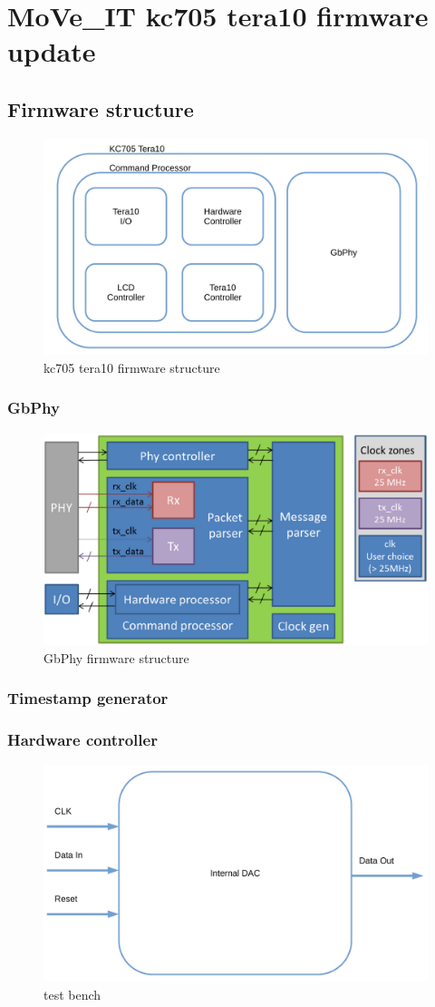 \chapter{MoVe\_IT kc705 tera10 firmware update}

\section{Firmware structure}
\noindent
\begin{figure}[H]
	\centering
	\includegraphics[width=0.7\linewidth]{IMG/ch4/TERA10}
	\caption{kc705 tera10 firmware structure}
	\label{fig:tera10}
\end{figure}

\subsection{GbPhy}

\begin{figure}[H]
	\centering
	\includegraphics[width=0.7\linewidth]{IMG/ch4/PHY100}
	\caption{GbPhy firmware structure}
	\label{fig:phy100}
\end{figure}

\subsection{Timestamp generator}

\subsection{Hardware controller}
\begin{figure}[H]
	\centering
	\includegraphics[width=0.5\linewidth]{IMG/ch4/INTERNALDAC}
	\caption{test bench}
	\label{fig:internaldac}
\end{figure}

